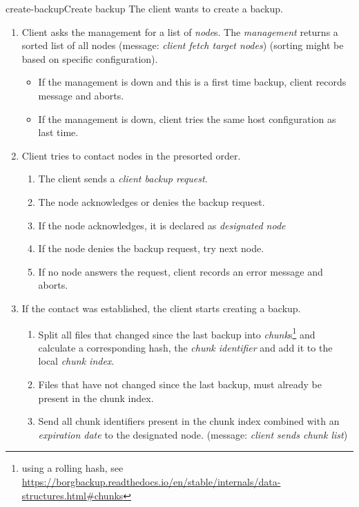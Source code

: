 \begin{scenario}{create-backup}{Create backup}
    The client wants to create a backup.
    
    \begin{enumerate}
    	\item Client asks the management for a list of \emph{node}s. The \emph{management} returns a sorted list of all nodes (message: \emph{client fetch target nodes}) (sorting might be based on specific configuration).
    		\begin{itemize}
    			\item If the management is down and this is a first time backup, client records message and aborts.
   				\item If the management is down, client tries the same host configuration as last time.
   			\end{itemize}
   		\item Client tries to contact nodes in the presorted order.
   			\begin{enumerate}
   				\item The client sends a \emph{client backup request}. %
   				\item The node acknowledges or denies the backup request.
   				\item If the node acknowledges, it is declared as \emph{designated node}
   				\item If the node denies the backup request, try next node.
   				\item If no node answers the request, client records an error message and aborts.
   			\end{enumerate}
   		\item If the contact was established, the client starts creating a backup.
   			\begin{enumerate}
   				\item Split all files that changed since the last backup into \emph{chunk}s\footnote{using a rolling hash, see \url{https://borgbackup.readthedocs.io/en/stable/internals/data-structures.html\#chunks}} and calculate a corresponding hash, the \emph{chunk identifier} and add it to the local \emph{chunk index}.
   				\item Files that have not changed since the last backup, must already be present in the chunk index.
   				\item Send all chunk identifiers present in the chunk index combined with an \emph{expiration date} to the designated node. (message: \emph{client sends chunk list})

\end{enumerate}
\end{enumerate}
\end{scenario}
